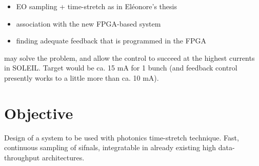 \begin{itemize}
	\item EO sampling + time-stretch as in Eléonore's thesis
	\item association with the new FPGA-based system
	\item finding adequate feedback that is programmed in the FPGA
\end{itemize}
may solve the problem, and allow the control to succeed at the highest currents in SOLEIL. 
Target would be ca. 15 mA for 1 bunch (and feedback control presently works to a little more than ca. 10 mA).

\section{Objective}
Design of a system to be used with photonics time-stretch technique. Fast, continuous sampling of sifnals, integratable in already existing high data-throughput architectures.






%









